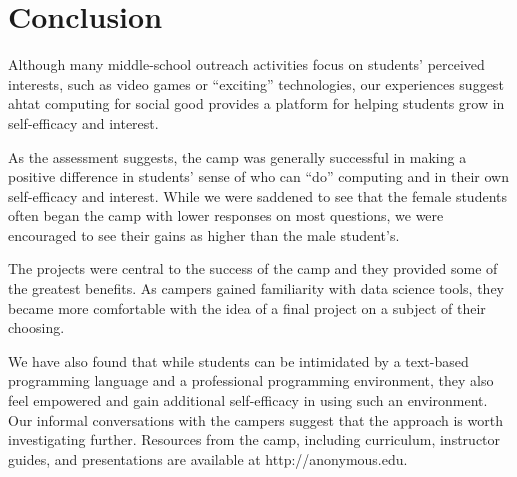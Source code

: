 \section{Conclusion}

Although many middle-school outreach activities focus on students'
perceived interests, such as video games or ``exciting'' technologies,
our experiences suggest ahtat computing for social good
provides a platform for helping students grow in self-efficacy and
interest.

As the assessment suggests, the camp was generally successful in
making a positive difference in students' sense of who can ``do''
computing and in their own self-efficacy and interest.  While we
were saddened to see that the female students often began the camp with
lower responses on most questions, we were encouraged to see their
gains as higher than the male student's.

The projects were central to the success of the camp and they
provided some of the greatest benefits.  As campers gained
familiarity with data science tools, they became more comfortable
with the idea of a final project on a subject of their choosing.

We have also found that while students can be intimidated by a
text-based programming language and a professional programming
environment, they also feel empowered and gain additional self-efficacy
in using such an environment.  Our informal conversations with the
campers suggest that the approach is worth investigating further.
Resources from the camp, including curriculum, instructor guides,
and presentations are available at http://anonymous.edu.
